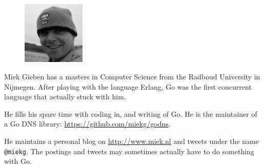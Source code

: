 \begin{figure}
  \begin{center}
  \includegraphics[width=3cm]{fig/avatar-miekg-300x300}
  \end{center}
\end{figure}
Miek Gieben has a masters in Computer Science from the Radboud University in Nijmegen.
After playing with the language Erlang, Go was the first concurrent language
that actually stuck with him.

He fills his spare time with coding in, and writing of Go. He is the maintainer
of a Go DNS library: \url{https://github.com/miekg/godns}.

He maintains a personal blog on \url{http://www.miek.nl} and tweets
under the name \texttt{@miekg}. The postings and tweets may sometimes 
actually have to do something with Go.
